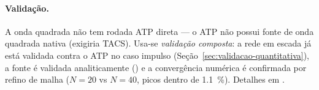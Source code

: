 \paragraph{Validação.} A onda quadrada não tem rodada ATP direta --- o ATP não possui fonte
de onda quadrada nativa (exigiria TACS). Usa-se \emph{validação composta}: a rede em escada
já está validada contra o ATP no caso impulso (Seção~\ref{sec:validacao-quantitativa}), a
fonte é validada analiticamente () e a convergência
numérica é confirmada por refino de malha ($N=20$ vs $N=40$, picos dentro de
\SI{1.1}{\percent}). Detalhes em .
